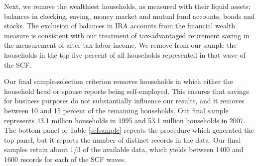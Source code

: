 \documentclass[fleqccn,12pt]{article}
\begin{document}
Next, we remove the wealthiest households, as measured with their liquid assets; balances in checking, saving, money market and mutual fund accounts, bonds and stocks. The exclusion of balances in IRA accounts from the financial wealth measure is consistent with our treatment of tax-advantaged retirement saving in the measurement of after-tax labor income. We remove from our sample the households  in the top five percent of all households represented in that wave of the SCF. 

Our final sample-selection criterion removes households in which either the household head or spouse reports being self-employed. This ensures that savings for business purposes do not substantially influence our results, and it removes between 10 and 15 percent of the remaining households. Our final sample represents 43.1 million households in 1995 and 53.1 million households in 2007. The bottom panel of Table \ref{scfsample} repeats the procedure which generated the top panel, but it reports the number of distinct records in the data. Our final samples retain about $1/3$ of the available data, which yields between 1400 and 1600 records for each of the SCF waves.
\end{document}
